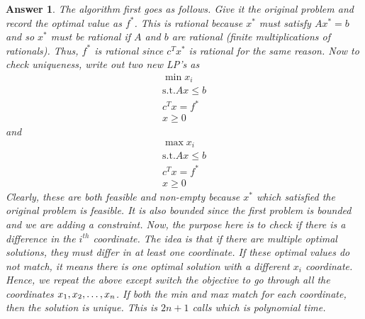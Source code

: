 \documentclass[12pt]{article}
\theoremstyle{colon}
\newtheorem*{answer}{Answer}
\begin{document}
\begin{answer}
  The algorithm first goes as follows. Give it the original problem and record the optimal value as $f^*$. This is rational because $x^*$ must satisfy $A x^* = b$ and so $x^*$ must be rational if $A$ and $b$ are rational (finite multiplications of rationals). Thus, $f^*$ is rational since $c^T x^*$ is rational for the same reason. Now to check uniqueness, write out two new LP's as
  \begin{gather*}
    \min x_i \\
    \text{s.t.} A x \leq b \\
      c^T x = f^* \\
      x \geq 0
  \end{gather*}
  and
  \begin{gather*}
    \max x_i \\
    \text{s.t.} A x \leq b \\
      c^T x = f^* \\
      x \geq 0
  \end{gather*}
  Clearly, these are both feasible and non-empty because $x^*$ which satisfied the original problem is feasible. It is also bounded since the first problem is bounded and we are adding a constraint. Now, the purpose here is to check if there is a difference in the $i^{th}$ coordinate. The idea is that if there are multiple optimal solutions, they must differ in at least one coordinate. If these optimal values do not match, it means there is one optimal solution with a different $x_i$ coordinate. Hence, we repeat the above except switch the objective to go through all the coordinates $x_1, x_2, \mathellipsis, x_n$. If both the min and max match for each coordinate, then the solution is unique. This is $2n + 1$ calls which is polynomial time.
\end{answer}

\clearpage
\end{document}
